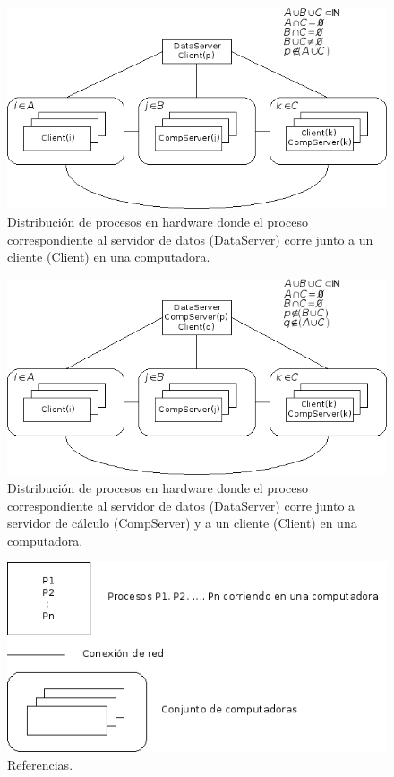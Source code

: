 \documentclass[a4paper,11pt]{article}
\begin{document}
\begin{figure}
\begin{center}
\includegraphics[scale=0.7]{./EstructuraFisica03.png}
\end{center}
\caption{Distribución de procesos en hardware donde el proceso correspondiente al servidor de datos (DataServer) corre junto a un cliente (Client) en una computadora.}
\end{figure}


\begin{figure}
\begin{center}
\includegraphics[scale=0.7]{./EstructuraFisica04.png}
\end{center}
\caption{Distribución de procesos en hardware donde el proceso correspondiente al servidor de datos (DataServer) corre junto a servidor de cálculo (CompServer) y a un cliente (Client) en una computadora.}
\end{figure}


\begin{figure}
\begin{center}
\includegraphics[scale=0.7]{./EstructuraFisica00.png}
\end{center}
\caption{Referencias.}
\end{figure}
\end{document}
